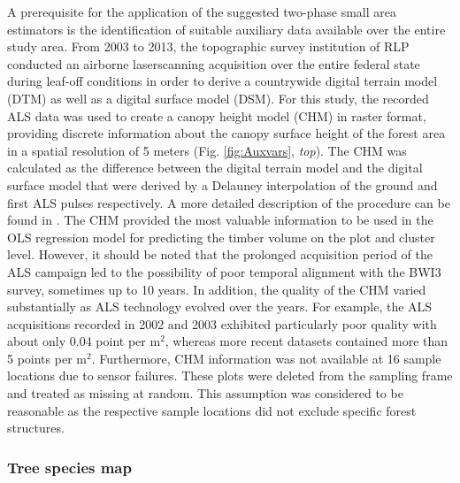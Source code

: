 A prerequisite for the application of the suggested two-phase small area estimators is the identification of suitable auxiliary data available over the entire study area. From 2003 to 2013, the topographic survey institution of RLP conducted an airborne laserscanning acquisition over the entire federal state during leaf-off conditions in order to derive a countrywide digital terrain model (DTM) as well as a digital surface model (DSM). For this study, the recorded ALS data was used to create a canopy height model (CHM) in raster format, providing discrete information about the canopy surface height of the forest area in a spatial resolution of 5 meters (Fig. \ref{fig:Auxvars}, \textit{top}). The CHM was calculated as the difference between the digital terrain model and the digital surface model that were derived by a Delauney interpolation of the ground and first ALS pulses respectively. A more detailed description of the procedure can be found in \citet{hill2017a}. The CHM provided the most valuable information to be used in the OLS regression model for predicting the timber volume on the plot and cluster level. However, it should be noted that the prolonged acquisition period of the ALS campaign led to the possibility of poor temporal alignment with the BWI3 survey, sometimes up to 10 years. In addition, the quality of the CHM varied substantially as ALS technology evolved over the years.  For example, the ALS acquisitions recorded in 2002 and 2003 exhibited particularly poor quality with about only 0.04 point per m$^2$, whereas more recent datasets contained more than 5 points per m$^2$. Furthermore, CHM information was not available at 16 sample locations due to sensor failures. These plots were deleted from the sampling frame and treated as missing at random. This assumption was considered to be reasonable as the respective sample locations did not exclude specific forest structures.

\subsubsection{Tree species map}
\label{sec:tspecclass}

